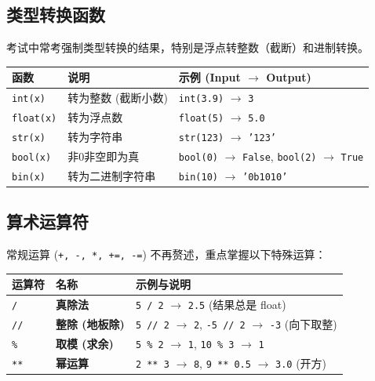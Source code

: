 \documentclass[12pt, a4paper]{article}
\begin{document}
\subsection{类型转换函数}

考试中常考强制类型转换的结果，特别是浮点转整数（截断）和进制转换。

\begin{table}[ht]
\centering
\begin{tabular}{l l l}
\toprule
\textbf{函数} & \textbf{说明} & \textbf{示例 (Input $\to$ Output)} \\
\midrule
\texttt{int(x)} & 转为整数 (截断小数) & \texttt{int(3.9)} $\to$ \texttt{3} \\
\texttt{float(x)} & 转为浮点数 & \texttt{float(5)} $\to$ \texttt{5.0} \\
\texttt{str(x)} & 转为字符串 & \texttt{str(123)} $\to$ \texttt{'123'} \\
\texttt{bool(x)} & 非0非空即为真 & \texttt{bool(0)} $\to$ \texttt{False}, \texttt{bool(2)} $\to$ \texttt{True} \\
\texttt{bin(x)} & 转为二进制字符串 & \texttt{bin(10)} $\to$ \texttt{'0b1010'} \\
\bottomrule
\end{tabular}
\end{table}

\subsection{算术运算符}

常规运算 (\texttt{+, -, *, +=, -=}) 不再赘述，重点掌握以下特殊运算：

\begin{longtable}{p{2cm} p{5cm} p{6cm}}
\toprule
\textbf{运算符} & \textbf{名称} & \textbf{示例与说明} \\
\midrule
\texttt{/} & \textbf{真除法} & \texttt{5 / 2} $\to$ \texttt{2.5} (结果总是 float) \\
\texttt{//} & \textbf{整除 (地板除)} & \texttt{5 // 2} $\to$ \texttt{2}, \texttt{-5 // 2} $\to$ \texttt{-3} (向下取整) \\
\texttt{\%} & \textbf{取模 (求余)} & \texttt{5 \% 2} $\to$ \texttt{1}, \texttt{10 \% 3} $\to$ \texttt{1} \\
\texttt{**} & \textbf{幂运算} & \texttt{2 ** 3} $\to$ \texttt{8}, \texttt{9 ** 0.5} $\to$ \texttt{3.0} (开方) \\
\bottomrule
\end{longtable}
\end{document}
